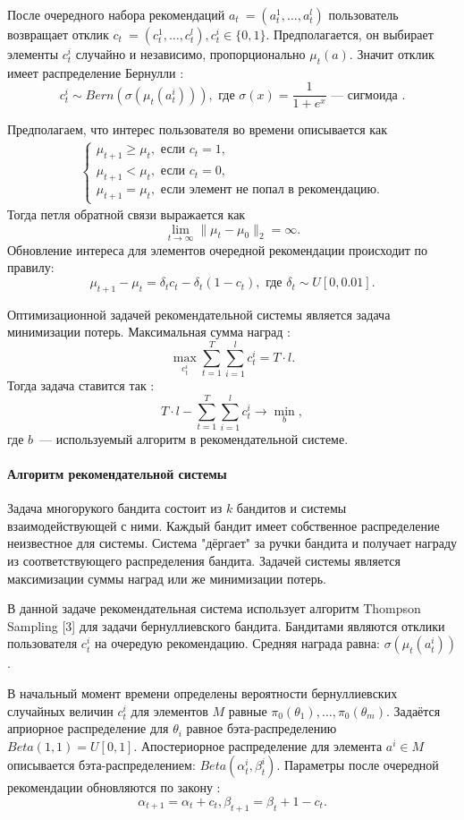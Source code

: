 \documentclass[12pt, twoside]{article}
\begin{document}
После очередного набора рекомендаций $a_t~= (a_t^1, \dots, a_t^l)$ пользователь возвращает $\textit{отклик}$ $c_t~= (c_t^1, \dots, c_t^l), c_t^i \in \{0, 1\}$. 
Предполагается, он выбирает элементы $c_t^i$ случайно и независимо, пропорционально $\mu_t(a)$.
Значит отклик имеет распределение Бернулли : 
\[c_t^i \sim Bern (\sigma(\mu_t(a_t^i))), \text{ где } \sigma(x) = \frac{1}{1+e^x}\text{~--- сигмоида }. \] 

Предполагаем, что интерес пользователя во времени описывается как 
\begin{gather*}
  \begin{cases}
    \mu_{t+1} \geq \mu_{t}, \text{ если } c_t = 1,  \\
    \mu_{t+1} < \mu_{t}, \text{ если } c_t = 0, \\
    \mu_{t+1} = \mu_t, \text{ если элемент не попал в рекомендацию}.
  \end{cases}
\end{gather*}
Тогда петля обратной связи выражается как \[ \lim_{t \to \infty} \|\mu_t - \mu_0 \|_2 = \infty. \]
Обновление интереса для элементов очередной рекомендации происходит по правилу: 
\[\mu_{t+1} - \mu_{t} = \delta_t c_t - \delta_t (1 - c_t), \text{ где } \delta_t \sim U[0, 0.01].\]

Оптимизационной задачей рекомендательной системы является задача минимизации потерь. 
Максимальная сумма наград : \[ \max_{c_t^i} \sum_{t = 1}^T \sum_{i = 1}^l c_t^i = T \cdot l.\] 
Тогда задача ставится так : 
\[
  T \cdot l - \sum_{t = 1}^T \sum_{i = 1}^l c_t^i \to \min_{b}, 
\]
где $b$~--- используемый алгоритм в рекомендательной системе. 

\paragraph{Алгоритм рекомендательной системы}
Задача многорукого бандита состоит из $k$ бандитов и системы взаимодействующей с ними. 
Каждый бандит имеет собственное распределение неизвестное для системы. 
Система "дёргает" за ручки бандита и получает награду из соответствующего распределения бандита. 
Задачей системы является максимизации суммы наград или же минимизации потерь. 

В данной задаче рекомендательная система использует алгоритм Thompson Sampling [3] для задачи бернуллиевского бандита.  
Бандитами являются отклики пользователя $c_t^i$ на очередую рекомендацию.
Средняя награда равна: $\sigma(\mu_t(a_t^i))$.

В начальный момент времени определены вероятности бернуллиевских случайных величин $c_t^i$ для элементов $M$ равные $\pi_0(\theta_1), \dots, \pi_0(\theta_m)$. 
Задаётся априорное распределение для $\theta_i$ равное бэта-распределению $Beta(1, 1) = U[0, 1]$. 
Апостериорное распределение для элемента $a^i \in M$ описывается бэта-распределением: $Beta(\alpha_t^i, \beta_t^i)$. 
Параметры после очередной рекомендации обновляются по закону :
\[\alpha_{t+1} = \alpha_t + c_t, \beta_{t+1} = \beta_t + 1 - c_t.\]
\end{document}
